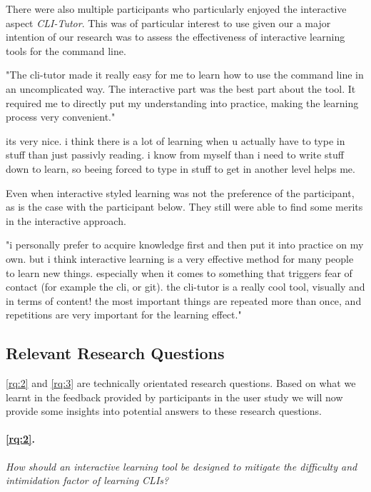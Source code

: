 There were also multiple participants who particularly enjoyed the interactive
aspect \textit{CLI-Tutor}. This was of particular interest to use given our a
major intention of our research was to assess the effectiveness of interactive
learning tools for the command line.

\begin{quotes}
	"The cli-tutor made it really easy for me to learn how to use the command line
	in an uncomplicated way. The interactive part was the best part about the tool.
	It required me to directly put my understanding into practice, making the
	learning process very convenient."
\end{quotes}

\begin{quotes}
	its very nice. i think there is a lot of learning when u actually have to type in stuff than just
	passivly reading. i know from myself than i need to write stuff down to learn, so beeing forced
	to type in stuff to get in another level helps me.
\end{quotes}

Even when interactive styled learning was not the preference of the participant,
as is the case with the participant below. They still were able to find some
merits in the interactive approach.

\begin{quotes}
	"i personally prefer to acquire knowledge first and then put it into practice on my own. but i
	think interactive learning is a very effective method for many people to learn new things.
	especially when it comes to something that triggers fear of contact (for example the cli, or git).
	the cli-tutor is a really cool tool, visually and in terms of content! the most important things are
	repeated more than once, and repetitions are very important for the learning effect."
\end{quotes}

\subsection{Relevant Research Questions}

\ref{rq:2} and \ref{rq:3} are technically orientated research questions. Based
on what we learnt in the feedback provided by participants in the user study we
will now provide some insights into potential answers to these research questions.


\paragraph{\ref{rq:2}.} \textit{How should an interactive learning tool be designed to mitigate
	the difficulty and intimidation factor of learning CLIs?}

